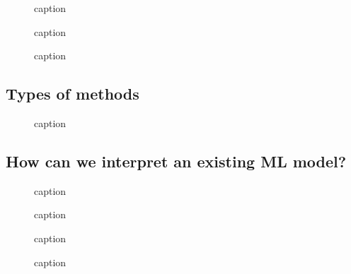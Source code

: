 \documentclass[11pt]{article}
\begin{document}
\begin{figure}[H]
    \centering
    \caption{caption}
\end{figure}

\begin{figure}[H]
    \centering
    \caption{caption}
\end{figure}

\begin{figure}[H]
    \centering
    \caption{caption}
\end{figure}

\subsection{Types of methods}

\begin{figure}[H]
    \centering
    \caption{caption}
\end{figure}

\subsection{How can we interpret an existing ML model?}

\begin{figure}[H]
    \centering
    \caption{caption}
\end{figure}

\begin{figure}[H]
    \centering
    \caption{caption}
\end{figure}

\begin{figure}[H]
    \centering
    \caption{caption}
\end{figure}

\begin{figure}[H]
    \centering
    \caption{caption}
\end{figure}
\end{document}
